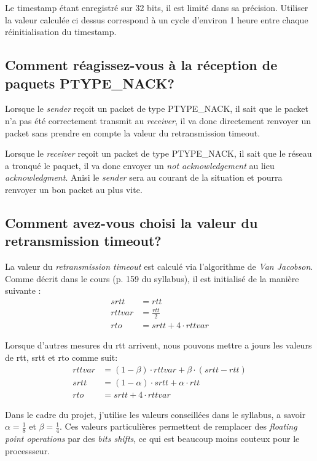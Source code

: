 \documentclass[10pt,a4paper]{article}
\begin{document}
Le timestamp étant enregistré sur 32 bits, il est limité dans sa précision. Utiliser la valeur calculée ci dessus correspond à un cycle d'environ 1 heure entre chaque réinitialisation du timestamp.

\subsection{Comment réagissez-vous à la réception de paquets PTYPE\_NACK?}
Lorsque le \textit{sender} reçoit un packet de type PTYPE\_NACK, il sait que le packet n'a pas été correctement transmit au \textit{receiver}, il va donc directement renvoyer un packet sans prendre en compte la valeur du retransmission timeout. 

Lorsque le \textit{receiver} reçoit un packet de type PTYPE\_NACK, il sait que le réseau a tronqué le paquet, il va donc envoyer un \textit{not acknowledgement} au lieu \textit{acknowledgment}. Anisi le \textit{sender} sera au courant de la situation et pourra renvoyer un bon packet au plus vite.

\subsection{Comment avez-vous choisi la valeur du retransmission timeout? \label{sec:jacob}}
La valeur du \textit{retransmission timeout} est calculé via l'algorithme de \textit{Van Jacobson}. Comme décrit dans le cours (p. 159 du syllabus), il est initialisé de la manière suivante : 
\begin{align*}
	srtt &= rtt \\
	rttvar &= \frac{rtt}{2} \\
	rto &= srtt + 4 \cdot rttvar
\end{align*}

Lorsque d'autres mesures du rtt arrivent, nous pouvons mettre a jours les valeurs de rtt, srtt et rto comme suit:
\begin{align*}
	rttvar &= (1-\beta) \cdot rttvar + \beta \cdot (srtt - rtt) \\
	srtt &= (1-\alpha) \cdot srtt + \alpha \cdot rtt \\
	rto &= srtt + 4 \cdot rttvar
\end{align*}

Dans le cadre du projet, j'utilise les valeurs conseillées dans le syllabus, a savoir $\alpha = \frac{1}{8}$ et $\beta = \frac{1}{4}$. Ces valeurs particulières permettent de remplacer des \textit{floating point operations} par des \textit{bits shifts}, ce qui est beaucoup moins couteux pour le processseur.
\end{document}
